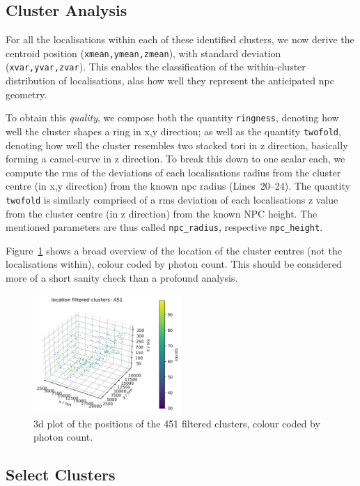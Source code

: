 \documentclass[11pt, a4paper, oneside, twocolumn]{report}
\renewcommand{\tt}{\texttt}
\newcommand{\e}{\emph}
\begin{document}
\subsection{Cluster Analysis}

For all the localisations within each of these identified clusters, we
now derive the centroid position (\tt{xmean,ymean,zmean}), with
standard deviation (\tt{xvar,yvar,zvar}). This enables the
classification of the within-cluster distribution of localisations,
alas how well they represent the anticipated \gls{npc} geometry.

To obtain this \e{quality}, we compose both the quantity
\tt{ringness}, denoting how well the cluster shapes a ring in x,y
direction; as well as the quantity \tt{twofold}, denoting how well the
cluster resembles two stacked tori in z direction, basically forming a
camel-curve in z direction. To break this down to one scalar each, we
compute the \gls{rms} of the deviations of each localisations radius
from the cluster centre (in x,y direction) from the known \gls{npc}
radius (Lines~20--24). The quantity \tt{twofold} is similarly
comprised of a \gls{rms} deviation of each localisations z value from
the cluster centre (in z direction) from the known NPC height. The
mentioned parameters are thus called \tt{npc\_radius}, respective
\tt{npc\_height}.

Figure~\ref{f:7_filtered_clusters} shows a broad overview of the
location of the cluster centres (not the localisations within), colour
coded by photon count. This should be considered more of a short
sanity check than a profound analysis.

\begin{figure}[h!]
  \centering
  \includegraphics[width=0.5\textwidth]{7_filtered_clusters.png}
  \caption{3d plot of the positions of the 451 filtered clusters,
    colour coded by photon count.}
  \label{f:7_filtered_clusters}
\end{figure}


\subsection{Select Clusters}
\end{document}
